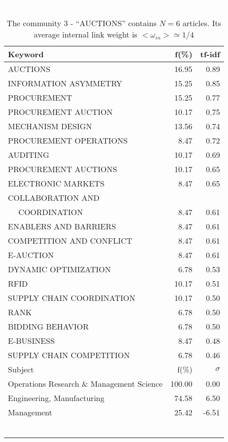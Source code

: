 \documentclass[a4paper,11pt]{report}
\begin{document}
\begin{landscape}
\clearpage

\begin{table}[!ht]
\caption{The community 3 - ``AUCTIONS'' contains $N = 6$ articles. Its average internal link weight is $<\omega_{in}> \simeq 1/4$ }
\textcolor{white}{aa}\\
{\scriptsize\begin{tabular}{|l r  r|}
\hline
Keyword & f(\%) & tf-idf \\
\hline
AUCTIONS & 16.95 & 0.89\\
INFORMATION ASYMMETRY & 15.25 & 0.85\\
PROCUREMENT & 15.25 & 0.77\\
PROCUREMENT AUCTION & 10.17 & 0.75\\
MECHANISM DESIGN & 13.56 & 0.74\\
PROCUREMENT OPERATIONS & 8.47 & 0.72\\
AUDITING & 10.17 & 0.69\\
PROCUREMENT AUCTIONS & 10.17 & 0.65\\
ELECTRONIC MARKETS & 8.47 & 0.65\\
COLLABORATION AND &  &\\
$\quad$ COORDINATION & 8.47 & 0.61\\
ENABLERS AND BARRIERS & 8.47 & 0.61\\
COMPETITION AND CONFLICT & 8.47 & 0.61\\
E-AUCTION & 8.47 & 0.61\\
DYNAMIC OPTIMIZATION & 6.78 & 0.53\\
RFID & 10.17 & 0.51\\
SUPPLY CHAIN COORDINATION & 10.17 & 0.50\\
RANK & 6.78 & 0.50\\
BIDDING BEHAVIOR & 6.78 & 0.50\\
E-BUSINESS & 8.47 & 0.48\\
SUPPLY CHAIN COMPETITION & 6.78 & 0.46\\
\hline
\hline
Subject & f(\%) & $\sigma$\\
\hline
Operations Research \& Management Science & 100.00 & 0.00\\
Engineering, Manufacturing & 74.58 & 6.50\\
Management & 25.42 & -6.51\\
 &  & \\
 &  & \\
 &  & \\
 &  & \\
 &  & \\
 &  & \\

\end{tabular}}
\end{table}
\end{landscape}
\end{document}
